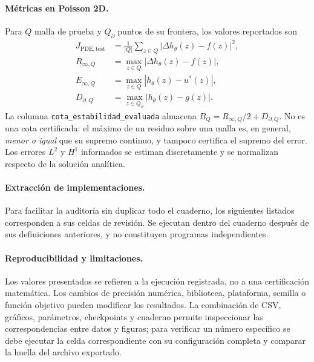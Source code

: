\paragraph{Métricas en Poisson 2D.}
Para $Q$ malla de prueba y $Q_\partial$ puntos de su frontera, los valores reportados son
\begin{align*}
 J_{\mathrm{PDE,test}}&=\frac{1}{|Q|}\sum_{z\in Q}|\Delta h_\theta(z)-f(z)|^2,\\
 R_{\infty,Q}&=\max_{z\in Q}|\Delta h_\theta(z)-f(z)|,\\
 E_{\infty,Q}&=\max_{z\in Q}|h_\theta(z)-u^*(z)|,\\
 D_{\partial,Q}&=\max_{z\in Q_\partial}|h_\theta(z)-g(z)|.
\end{align*}
La columna \texttt{cota\_estabilidad\_evaluada} almacena $B_Q=R_{\infty,Q}/2+D_{\partial,Q}$. No es una cota certificada: el máximo de un residuo sobre una malla es, en general, \emph{menor o igual} que su supremo continuo, y tampoco certifica el supremo del error. Los errores $L^2$ y $H^1$ informados se estiman discretamente y se normalizan respecto de la solución analítica.

\paragraph{Extracción de implementaciones.}
Para facilitar la auditoría sin duplicar todo el cuaderno, los siguientes listados corresponden a sus celdas de revisión. Se ejecutan dentro del cuaderno después de sus definiciones anteriores, y no constituyen programas independientes.




\paragraph{Reproducibilidad y limitaciones.}
Los valores presentados se refieren a la ejecución registrada, no a una certificación matemática. Los cambios de precisión numérica, biblioteca, plataforma, semilla o función objetivo pueden modificar los resultados. La combinación de CSV, gráficos, parámetros, checkpoints y cuaderno permite inspeccionar las correspondencias entre datos y figuras; para verificar un número específico se debe ejecutar la celda correspondiente con su configuración completa y comparar la huella del archivo exportado.


